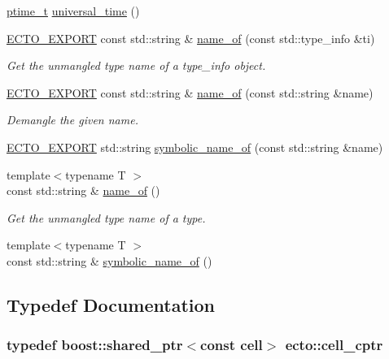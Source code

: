 \begin{DoxyCompactItemize}
\hyperlink{namespaceecto_a5bbe8fb0da047cb18d92eb9dfb469652}{ptime\+\_\+t} \hyperlink{namespaceecto_ad48a07c99914e7c96702bcce4baf6bc6}{universal\+\_\+time} ()
\item 
\hyperlink{util_8hpp_ab55b7868679cda60fc162580957fb98c}{E\+C\+T\+O\+\_\+\+E\+X\+P\+O\+R\+T} const std\+::string \& \hyperlink{namespaceecto_a980294f61090496ef65bc6b201f38944}{name\+\_\+of} (const std\+::type\+\_\+info \&ti)
\begin{DoxyCompactList}\small\item\em Get the unmangled type name of a type\+\_\+info object. \end{DoxyCompactList}\item 
\hyperlink{util_8hpp_ab55b7868679cda60fc162580957fb98c}{E\+C\+T\+O\+\_\+\+E\+X\+P\+O\+R\+T} const std\+::string \& \hyperlink{namespaceecto_ae8640f8758655b241efbd681cef5727f}{name\+\_\+of} (const std\+::string \&name)
\begin{DoxyCompactList}\small\item\em Demangle the given name. \end{DoxyCompactList}\item 
\hyperlink{util_8hpp_ab55b7868679cda60fc162580957fb98c}{E\+C\+T\+O\+\_\+\+E\+X\+P\+O\+R\+T} std\+::string \hyperlink{namespaceecto_a56b14793c548143a90d5bff5a7c279b8}{symbolic\+\_\+name\+\_\+of} (const std\+::string \&name)
\item 
{\footnotesize template$<$typename T $>$ }\\const std\+::string \& \hyperlink{namespaceecto_a2420930e76b8e95a3f241c4dc154f8f8}{name\+\_\+of} ()
\begin{DoxyCompactList}\small\item\em Get the unmangled type name of a type. \end{DoxyCompactList}\item 
{\footnotesize template$<$typename T $>$ }\\const std\+::string \& \hyperlink{namespaceecto_a1df1f18305fe27e87f2a845d02f31db9}{symbolic\+\_\+name\+\_\+of} ()
\end{DoxyCompactItemize}


\subsection{Typedef Documentation}
\hypertarget{namespaceecto_ab708c826226c91fd6f3c8c121f293a78}{}
\subsubsection[{cell\+\_\+cptr}]{\setlength{\rightskip}{0pt plus 5cm}typedef boost\+::shared\+\_\+ptr$<$const {\bf cell}$>$ {\bf ecto\+::cell\+\_\+cptr}}\label{namespaceecto_ab708c826226c91fd6f3c8c121f293a78}
\hypertarget{namespaceecto_aed1809e82b9229ea81ef9ee3438cf62c}{}
